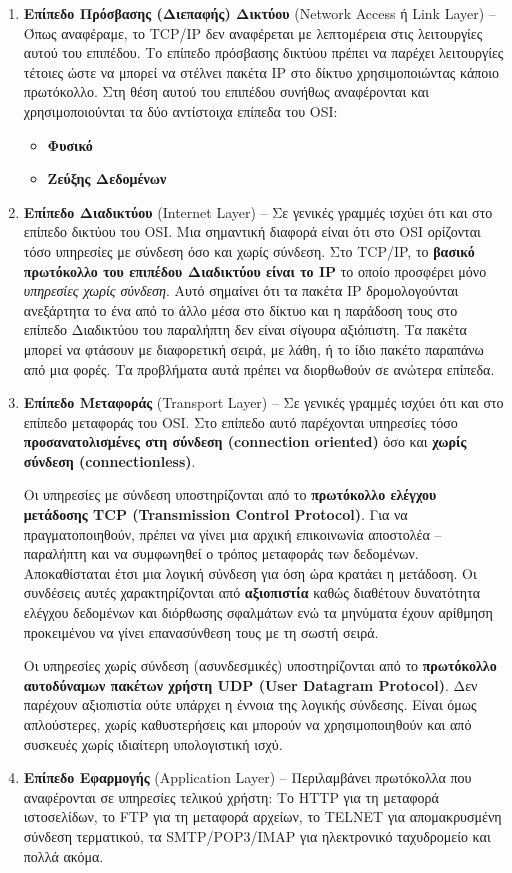 \begin{enumerate}
\item \textbf{Επίπεδο Πρόσβασης (Διεπαφής) Δικτύου} (Network Access ή Link Layer) -- Όπως αναφέραμε, το TCP/IP δεν αναφέρεται με λεπτομέρεια στις λειτουργίες αυτού του επιπέδου. Το επίπεδο πρόσβασης δικτύου πρέπει να παρέχει λειτουργίες τέτοιες ώστε να μπορεί να στέλνει πακέτα IP στο δίκτυο χρησιμοποιώντας κάποιο πρωτόκολλο. Στη θέση αυτού του επιπέδου συνήθως αναφέρονται και χρησιμοποιούνται τα δύο αντίστοιχα επίπεδα του OSI:
  \begin{itemize}
     \item \textbf{Φυσικό}
     \item \textbf{Ζεύξης Δεδομένων}
  \end{itemize}
\item \textbf{Επίπεδο Διαδικτύου} (Internet Layer) -- Σε γενικές γραμμές ισχύει ότι και στο επίπεδο δικτύου του OSI. Μια σημαντική διαφορά είναι ότι στο OSI ορίζονται τόσο υπηρεσίες με σύνδεση όσο και χωρίς σύνδεση. Στο TCP/IP, το \textbf{βασικό πρωτόκολλο του επιπέδου Διαδικτύου είναι το IP} το οποίο προσφέρει μόνο \emph{υπηρεσίες χωρίς σύνδεση}. Αυτό σημαίνει ότι τα πακέτα IP δρομολογούνται ανεξάρτητα το ένα από το άλλο μέσα στο δίκτυο και η παράδοση τους στο επίπεδο Διαδικτύου του παραλήπτη δεν είναι σίγουρα αξιόπιστη. Τα πακέτα μπορεί να φτάσουν με διαφορετική σειρά, με λάθη, ή το ίδιο πακέτο παραπάνω από μια φορές. Τα προβλήματα αυτά πρέπει να διορθωθούν σε ανώτερα επίπεδα.
\item \textbf{Επίπεδο Μεταφοράς} (Transport Layer) -- Σε γενικές γραμμές ισχύει ότι και στο επίπεδο μεταφοράς του OSI. Στο επίπεδο αυτό παρέχονται υπηρεσίες τόσο \textbf{προσανατολισμένες στη σύνδεση (connection oriented)} όσο και \textbf{χωρίς σύνδεση (connectionless)}.

Οι υπηρεσίες με σύνδεση υποστηρίζονται από το \textbf{πρωτόκολλο ελέγχου μετάδοσης TCP (Transmission Control Protocol)}. Για να πραγματοποιηθούν, πρέπει να γίνει μια αρχική επικοινωνία αποστολέα -- παραλήπτη και να συμφωνηθεί ο τρόπος μεταφοράς των δεδομένων. Αποκαθίσταται έτσι μια λογική σύνδεση για όση ώρα κρατάει η μετάδοση. Οι συνδέσεις αυτές χαρακτηρίζονται από \textbf{αξιοπιστία} καθώς διαθέτουν δυνατότητα ελέγχου δεδομένων και διόρθωσης σφαλμάτων ενώ τα μηνύματα έχουν αρίθμηση προκειμένου να γίνει επανασύνθεση τους με τη σωστή σειρά. 

Οι υπηρεσίες χωρίς σύνδεση (ασυνδεσμικές) υποστηρίζονται από το \textbf{πρωτόκολλο αυτοδύναμων πακέτων χρήστη UDP (User Datagram Protocol)}. Δεν παρέχουν αξιοπιστία ούτε υπάρχει η έννοια της λογικής σύνδεσης. Είναι όμως απλούστερες, χωρίς καθυστερήσεις και μπορούν να χρησιμοποιηθούν και από συσκευές χωρίς ιδιαίτερη υπολογιστική ισχύ.
\item \textbf{Επίπεδο Εφαρμογής} (Application Layer) -- Περιλαμβάνει πρωτόκολλα που αναφέρονται σε υπηρεσίες τελικού χρήστη: Το HTTP για τη μεταφορά ιστοσελίδων, το FTP για τη μεταφορά αρχείων, το TELNET για απομακρυσμένη σύνδεση τερματικού, τα SMTP/POP3/IMAP για ηλεκτρονικό ταχυδρομείο και πολλά ακόμα. 
\end{enumerate}